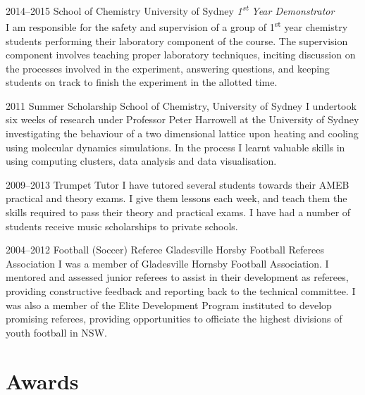 \documentclass[print]{friggeri-cv} %
\begin{document}
{\begin{entrylist}

\entry
{2014--2015}
{School of Chemistry}
{University of Sydney}
{\emph{1\textsuperscript{st} Year Demonstrator} \\
    I am responsible for the safety and supervision of a group of 1\textsuperscript{st} year chemistry students performing their laboratory component of the course. The supervision component involves teaching proper laboratory techniques, inciting discussion on the processes involved in the experiment, answering questions, and keeping students on track to finish the experiment in the allotted time.}


\entry
{2011}
{Summer Scholarship}
{School of Chemistry, University of Sydney}
{I undertook six weeks of research under Professor Peter Harrowell at the University of Sydney investigating the behaviour of a two dimensional lattice upon heating and cooling using molecular dynamics simulations. In the process I learnt valuable skills in using computing clusters, data analysis and data visualisation.}


\entry
{2009--2013}
{Trumpet Tutor}
{}
{I have tutored several students towards their AMEB practical and theory exams. I give them lessons each week, and teach them the skills required to pass their theory and practical exams. I have had a number of students receive music scholarships to private schools.}

\entry
{2004--2012}
{Football (Soccer) Referee}
{Gladesville Horsby Football Referees Association}
{I was a member of Gladesville Hornsby Football Association. I mentored and assessed junior referees to assist in their development as referees, providing constructive feedback and reporting back to the technical committee. I was also a member of the Elite Development Program instituted to develop promising referees, providing opportunities to officiate the highest divisions of youth football in NSW.}

\end{entrylist}


\section{Awards}

}
\end{document}
